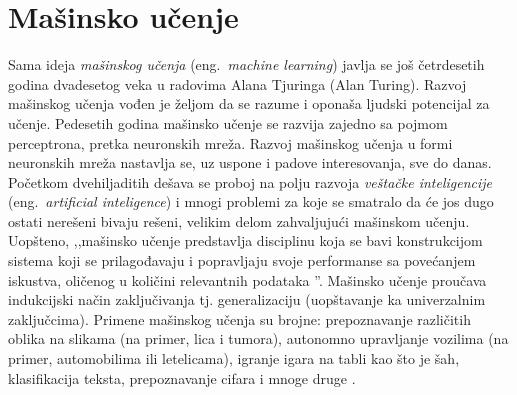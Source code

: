 \documentclass[12pt,oneside]{memoir}
\begin{document}




\chapter{Mašinsko učenje}
\label{chp:mašinsko učenje}


Sama ideja \textit{mašinskog učenja} (eng.~\textit{machine learning}) javlja se još četrdesetih godina dvadesetog veka u radovima Alana Tjuringa (Alan Turing). Razvoj mašinskog učenja vođen je željom da se razume i oponaša ljudski potencijal za učenje. Pedesetih godina mašinsko učenje se razvija zajedno sa pojmom perceptrona, pretka neuronskih mreža. %
Razvoj mašinskog učenja u formi neuronskih mreža nastavlja se, uz uspone i padove interesovanja, sve do danas. Početkom dvehiljaditih dešava se proboj na polju razvoja \textit{veštačke inteligencije} (eng.~\textit{artificial inteligence}) i mnogi problemi za koje se smatralo da će jos dugo ostati nerešeni bivaju rešeni, velikim delom zahvaljujući mašinskom učenju. Uopšteno, ,,mašinsko učenje predstavlja disciplinu koja se bavi konstrukcijom sistema koji se prilagođavaju i popravljaju svoje performanse sa povećanjem iskustva, oličenog u količini relevantnih podataka \cite{mladen}''. Mašinsko učenje proučava indukcijski način zaključivanja tj. generalizaciju (uopštavanje ka univerzalnim zaključcima). Primene mašinskog učenja su brojne: prepoznavanje različitih oblika na slikama (na primer, lica i tumora), autonomno upravljanje vozilima (na primer, automobilima ili letelicama), igranje igara na tabli kao što je šah, klasifikacija teksta, prepoznavanje cifara i mnoge druge \cite{mladen}.
\end{document}
